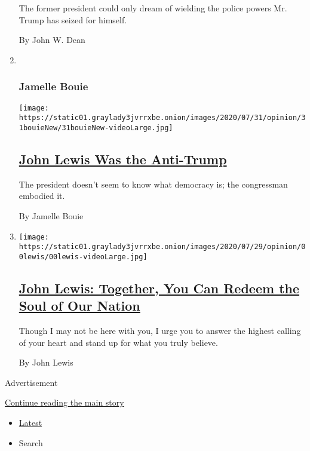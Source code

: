 \begin{enumerate}
  The former president could only dream of wielding the police powers
  Mr. Trump has seized for himself.

  By John W. Dean
\item ~
  \hypertarget{jamelle-bouie}{%
  \subsubsection{Jamelle Bouie}\label{jamelle-bouie}}

  \texttt{[image: https://static01.graylady3jvrrxbe.onion/images/2020/07/31/opinion/31bouieNew/31bouieNew-videoLarge.jpg]}

  \hypertarget{john-lewis-was-the-anti-trump}{%
  \subsection{\texorpdfstring{\href{/2020/07/31/opinion/john-lewis-trump-election-2020.html}{John
  Lewis Was the
  Anti-Trump}}{John Lewis Was the Anti-Trump}}\label{john-lewis-was-the-anti-trump}}

  The president doesn't seem to know what democracy is; the congressman
  embodied it.

  By Jamelle Bouie
\item
  \texttt{[image: https://static01.graylady3jvrrxbe.onion/images/2020/07/29/opinion/00lewis/00lewis-videoLarge.jpg]}

  \hypertarget{john-lewis-together-you-can-redeem-the-soul-of-our-nation}{%
  \subsection{\texorpdfstring{\href{/2020/07/30/opinion/john-lewis-civil-rights-america.html}{John
  Lewis: Together, You Can Redeem the Soul of Our
  Nation}}{John Lewis: Together, You Can Redeem the Soul of Our Nation}}\label{john-lewis-together-you-can-redeem-the-soul-of-our-nation}}

  Though I may not be here with you, I urge you to answer the highest
  calling of your heart and stand up for what you truly believe.

  By John Lewis
\end{enumerate}

Advertisement

\protect\hyperlink{after-mid1}{Continue reading the main story}

\begin{itemize}
\tightlist
\item
  \protect\hyperlink{stream-panel}{Latest}
\item
  Search
\end{itemize}

